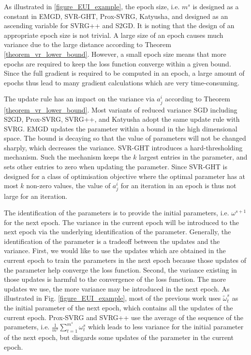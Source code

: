 \documentclass[letterpaper]{article}
\begin{document}
 As illustrated in \ref{figure_EUI_example}, the epoch size, i.e. $m^s$ is designed as a constant in EMGD, SVR-GHT, Prox-SVRG, Katyusha, and designed as an ascending variable for SVRG++ and S2GD. It is noting that the design of an appropriate epoch size is not trivial. A large size of an epoch causes much variance due to the large distance according to Theorem \ref{theorem_vr_lower_bound}. However, a small epoch size means that more epochs are required to keep the loss function converge within a given bound. Since the full gradient is required to be computed in an epoch, a large amount of epochs  thus lead to many gradient calculations which are very time-consuming.  

The update rule has an impact on the variance via $a_j^i$ according to Theorem \ref{theorem_vr_lower_bound}. Most variants of reduced variance SGD including S2GD, Prox-SVRG, SVRG++, and Katyusha adopt the same update rule with SVRG. EMGD updates the parameter within a bound in the high dimensional space. The bound is decaying so that the value of parameters will not be changed sharply, which decreases the variance. SVR-GHT introduces a hard-thresholding mechanism. Such the mechanism keeps the $k$ largest entries in the parameter, and sets other entries to zero when updating the parameter. Since SVR-GHT is designed for a class of optimisation objective where the optimal parameter has at most $k$ non-zero values,  the value of $a_j^i$ for an iteration in an epoch is thus not large for an iteration.

The identification of the parameters is to provide the initial parameters, i.e. $\omega^{s+1}$ for the next epoch. The variance in the current epoch will be introduced to the next epoch via the underlying identification of the parameter. Generally, the identification of the parameter is a tradeoff between the updates and the variance. First, we would like to use the updates which are obtained in the current epoch to train the parameters in the next epoch because those updates of the parameter help converge the loss function. Second, the variance existing in those updates is harmful to the convergence of the loss function. The more updates we use, the more variance may be introduced in the next epoch. As illustrated in Fig. \ref{figure_EUI_example}, most of the previous work uses $\tilde{\omega}_t^s$ as the initial parameter of the next epoch, which contains all the updates of the current epoch. Prox-SVRG and SVRG++ use the average of the sequence of the parameters, i.e. $\frac{1}{m^s}\sum\limits_{t=1}^{m^s}\omega_t^s$ which leads to less variance for the initial parameter of the next epoch, but disgards some updates of the parameter in the current epoch. 
\end{document}
